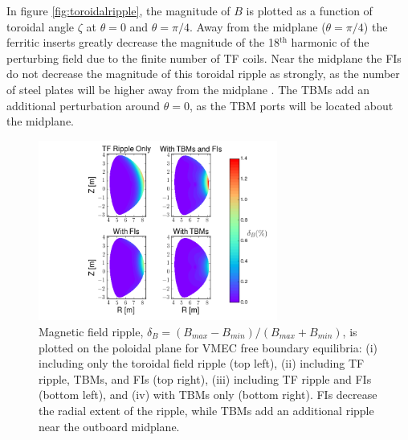 \documentclass{article}
\numberwithin{figure}{section}
\numberwithin{equation}{section}
\begin{document}
In figure \ref{fig:toroidalripple}, the magnitude of $B$ is plotted as a function of toroidal angle $\zeta$ at $\theta = 0$ and $\theta = \pi/4$. Away from the midplane ($\theta = \pi/4$) the ferritic inserts greatly decrease the magnitude of the 18$^{\text{th}}$ harmonic of the perturbing field due to the finite number of TF coils. Near the midplane the FIs do not decrease the magnitude of this toroidal ripple as strongly, as the number of steel plates will be higher away from the midplane \cite{Shinohara2009}. The TBMs add an additional perturbation around $\theta = 0$, as the TBM ports will be located about the midplane. 

\FloatBarrier

\begin{figure}[h!]
\centering
\includegraphics[width=0.7\textwidth]{ripplecontour.png}
\caption{\label{fig:ripplecontour} Magnetic field ripple, $\delta_B = (B_{max}-B_{min})/(B_{max} + B_{min})$, is plotted on the poloidal plane for VMEC free boundary equilibria: (i) including only the toroidal field ripple (top left), (ii) including TF ripple, TBMs, and FIs (top right), (iii) including TF ripple and FIs (bottom left), and (iv) with TBMs only (bottom right). FIs decrease the radial extent of the ripple, while TBMs add an additional ripple near the outboard midplane.}
\end{figure}
\end{document}
